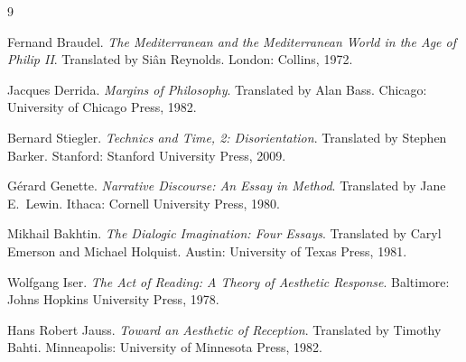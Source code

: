 \documentclass[12pt,a4paper]{article}
\begin{document}

\begin{thebibliography}{9}

Fernand Braudel.
\newblock \emph{The Mediterranean and the Mediterranean World in the Age of Philip II}.
\newblock Translated by Si\^{a}n Reynolds. London: Collins, 1972.

Jacques Derrida.
\newblock \emph{Margins of Philosophy}.
\newblock Translated by Alan Bass. Chicago: University of Chicago Press, 1982.

Bernard Stiegler.
\newblock \emph{Technics and Time, 2: Disorientation}.
\newblock Translated by Stephen Barker. Stanford: Stanford University Press, 2009.

G\'erard Genette.
\newblock \emph{Narrative Discourse: An Essay in Method}.
\newblock Translated by Jane E.\ Lewin. Ithaca: Cornell University Press, 1980.

Mikhail Bakhtin.
\newblock \emph{The Dialogic Imagination: Four Essays}.
\newblock Translated by Caryl Emerson and Michael Holquist. Austin: University of Texas Press, 1981.

Wolfgang Iser.
\newblock \emph{The Act of Reading: A Theory of Aesthetic Response}.
\newblock Baltimore: Johns Hopkins University Press, 1978.

Hans Robert Jauss.
\newblock \emph{Toward an Aesthetic of Reception}.
\newblock Translated by Timothy Bahti. Minneapolis: University of Minnesota Press, 1982.

\end{thebibliography}
\end{document}
